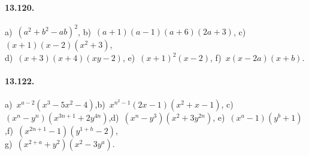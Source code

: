 \paragraph{13.120.}
a)~$\left(a^{2}+b^{2}-ab\right)^{2}$,\quad
b)~$(a+1)(a-1)(a+6)(2a+3)$,\quad
c)~$(x+1)(x-2)\left(x^{2}+3\right)$,\protect\\
d)~$(x+3)(x+4)(xy-2)$,\quad 
e)~$(x+1)^{2}(x-2)$,\quad
f)~$x(x-2a)(x+b)$.

\paragraph{13.122.} a)~$x^{a-2}(x^{3}-5x^{2}-4)$,\quad b)~$x^{n^{2}-1}(2x-1)(x^{2}+x-1)$,\quad
c)~$(x^{n}-y^{n})(x^{3n+1}+2y^{4n})$,\quad d)~$(x^{n}-y^{3})(x^{2}+3y^{2n})$,\quad
e)~$(x^{a}-1)(y^{b}+1)$,\quad f)~$(x^{2n+1}-1)(y^{1+h}-2)$,\protect\\
g)~$(x^{2+a}+y^{2})(x^{2}-3y^{a})$.
